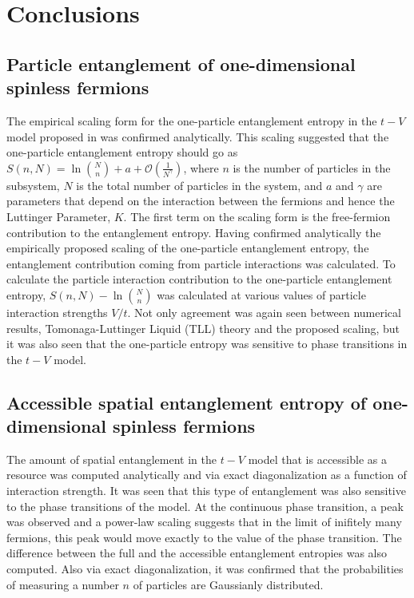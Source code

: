 \section{Conclusions}

\subsection{Particle entanglement of one-dimensional spinless fermions}

The empirical scaling form for the one-particle entanglement entropy in the $t-V$ model proposed in \cite{Zozulya:2008kb} was confirmed analytically. This scaling suggested that the one-particle entanglement entropy should go as $S(n,N) = \ln{{N}\choose{n}} + a + \mathcal{O}(\frac{1}{N^{\gamma}})$, where $n$ is the number of particles in the subsystem, $N$ is the total number of particles in the system, and $a$ and $\gamma$ are parameters that depend on the interaction between the fermions and hence the Luttinger Parameter, $K$.  The first term on the scaling form is the free-fermion contribution to the entanglement entropy. Having confirmed analytically the empirically proposed scaling of the one-particle entanglement entropy, the entanglement contribution coming from particle interactions was calculated. To calculate the particle interaction contribution to the one-particle entanglement entropy,  $S(n,N) - \ln{{N}\choose{n}}$ was calculated at various values of particle interaction strengths $V/t$. Not only agreement was again seen between numerical results, Tomonaga-Luttinger Liquid (TLL) theory and the proposed scaling, but it was also seen that the one-particle entropy was sensitive to phase transitions in the $t-V$ model.

\subsection{Accessible spatial entanglement entropy of one-dimensional spinless fermions}

The amount of spatial entanglement in the $t-V$ model that is accessible as a resource was computed analytically and via exact diagonalization as a function of interaction strength. It was seen that this type of entanglement was also sensitive to the phase transitions of the model. At the continuous phase transition, a peak was observed and a power-law scaling suggests that in the limit of inifitely many fermions, this peak would move exactly to the value of the phase transition. The difference between the full and the accessible entanglement entropies was also computed. Also via exact diagonalization, it was confirmed that the probabilities of measuring a number $n$ of particles are Gaussianly distributed.

